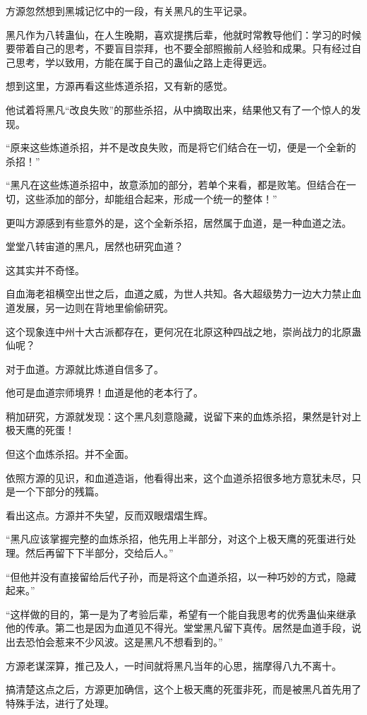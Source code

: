 \begin{this_body}
方源忽然想到黑城记忆中的一段，有关黑凡的生平记录。

黑凡作为八转蛊仙，在人生晚期，喜欢提携后辈，他就时常教导他们：学习的时候要带着自己的思考，不要盲目崇拜，也不要全部照搬前人经验和成果。只有经过自己思考，学以致用，方能在属于自己的蛊仙之路上走得更远。

想到这里，方源再看这些炼道杀招，又有新的感觉。

他试着将黑凡“改良失败”的那些杀招，从中摘取出来，结果他又有了一个惊人的发现。

“原来这些炼道杀招，并不是改良失败，而是将它们结合在一切，便是一个全新的杀招！”

“黑凡在这些炼道杀招中，故意添加的部分，若单个来看，都是败笔。但结合在一切，这些添加的部分，却能组合起来，形成一个统一的整体！”

更叫方源感到有些意外的是，这个全新杀招，居然属于血道，是一种血道之法。

堂堂八转宙道的黑凡，居然也研究血道？

这其实并不奇怪。

自血海老祖横空出世之后，血道之威，为世人共知。各大超级势力一边大力禁止血道发展，另一边则在背地里偷偷研究。

这个现象连中州十大古派都存在，更何况在北原这种四战之地，崇尚战力的北原蛊仙呢？

对于血道。方源就比炼道自信多了。

他可是血道宗师境界！血道是他的老本行了。

稍加研究，方源就发现：这个黑凡刻意隐藏，说留下来的血炼杀招，果然是针对上极天鹰的死蛋！

但这个血炼杀招。并不全面。

依照方源的见识，和血道造诣，他看得出来，这个血道杀招很多地方意犹未尽，只是一个下部分的残篇。

看出这点。方源并不失望，反而双眼熠熠生辉。

“黑凡应该掌握完整的血炼杀招，他先用上半部分，对这个上极天鹰的死蛋进行处理。然后再留下下半部分，交给后人。”

“但他并没有直接留给后代子孙，而是将这个血道杀招，以一种巧妙的方式，隐藏起来。”

“这样做的目的，第一是为了考验后辈，希望有一个能自我思考的优秀蛊仙来继承他的传承。第二也是因为血道见不得光。堂堂黑凡留下真传。居然是血道手段，说出去恐怕会惹来不少风波。这是黑凡不想看到的。”

方源老谋深算，推己及人，一时间就将黑凡当年的心思，揣摩得八九不离十。

搞清楚这点之后，方源更加确信，这个上极天鹰的死蛋非死，而是被黑凡首先用了特殊手法，进行了处理。


\end{this_body}

